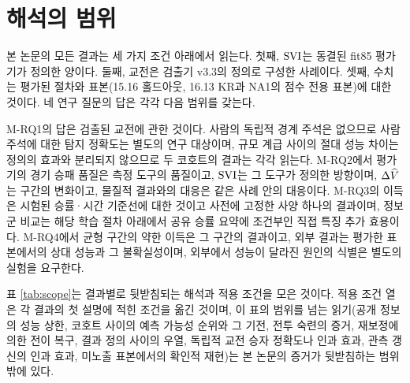\section{해석의 범위}
\label{sec:disc-scope}

본 논문의 모든 결과는 세 가지 조건 아래에서 읽는다. 첫째, $\mathrm{SVI}$는 동결된 fit85 평가기가 정의한 양이다. 둘째, 교전은 검출기 v3.3의 정의로 구성한 사례이다. 셋째, 수치는 평가된 절차와 표본(15.16 홀드아웃, 16.13 KR과 NA1의 점수 전용 표본)에 대한 것이다. 네 연구 질문의 답은 각각 다음 범위를 갖는다.

M-RQ1의 답은 검출된 교전에 관한 것이다. 사람의 독립적 경계 주석은 없으므로 사람 주석에 대한 탐지 정확도는 별도의 연구 대상이며, 규모 계급 사이의 절대 성능 차이는 정의의 효과와 분리되지 않으므로 두 코호트의 결과는 각각 읽는다. M-RQ2에서 평가기의 경기 승패 품질은 측정 도구의 품질이고, $\mathrm{SVI}$는 그 도구가 정의한 방향이며, $\Delta\widehat V$는 구간의 변화이고, 물질적 결과와의 대응은 같은 사례 안의 대응이다. M-RQ3의 이득은 시험된 승률·시간 기준선에 대한 것이고 사전에 고정한 사양 하나의 결과이며, 정보군 비교는 해당 학습 절차 아래에서 공유 승률 요약에 조건부인 직접 특징 추가 효용이다. M-RQ4에서 균형 구간의 약한 이득은 그 구간의 결과이고, 외부 결과는 평가한 표본에서의 상대 성능과 그 불확실성이며, 외부에서 성능이 달라진 원인의 식별은 별도의 실험을 요구한다.

표 \ref{tab:scope}는 결과별로 뒷받침되는 해석과 적용 조건을 모은 것이다. 적용 조건 열은 각 결과의 첫 설명에 적힌 조건을 옮긴 것이며, 이 표의 범위를 넘는 읽기(공개 정보의 성능 상한, 코호트 사이의 예측 가능성 순위와 그 기전, 전투 숙련의 증거, 재보정에 의한 전이 복구, 결과 정의 사이의 우열, 독립적 교전 승자 정확도나 인과 효과, 관측 갱신의 인과 효과, 미노출 표본에서의 확인적 재현)는 본 논문의 증거가 뒷받침하는 범위 밖에 있다.


